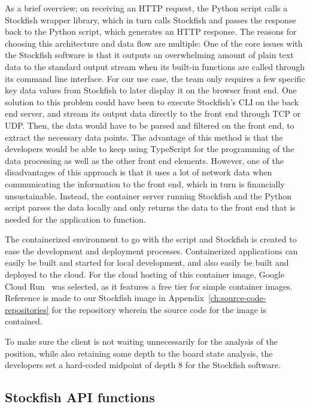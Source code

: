 As a brief overview; on receiving an HTTP request, the Python script calls a Stockfish wrapper library,
which in turn calls Stockfish and passes the response back to the Python script, which generates an HTTP response.
The reasons for choosing this architecture and data flow are multiple:
One of the core issues with the Stockfish software is that it outputs an overwhelming amount of plain text data to the
standard output stream when its built-in functions are called through its command line interface.
For our use case, the team only requires a few specific key data values from Stockfish to later display it on the
browser front end.
One solution to this problem could have been to execute Stockfish's CLI on the back end server, and stream its output
data directly to the front end through TCP or UDP\@.
Then, the data would have to be parsed and filtered on the front end, to extract the necessary data points.
The advantage of this method is that the developers would be able to keep using TypeScript for the programming of the
data processing as well as the other front end elements.
However, one of the disadvantages of this approach is that it uses a lot of network data when communicating the
information to the front end, which in turn is financially unsustainable.
Instead, the container server running Stockfish and the Python script parses the data locally and only returns the data
to the front end that is needed for the application to function.

The containerized environment to go with the script and Stockfish is created to ease the development and deployment
processes.
Containerized applications can easily be built and started for local development, and also easily be built and deployed
to the cloud.
For the cloud hosting of this container image, Google Cloud Run~\cite{google-cloud-run} was selected, as it features
a free tier for simple container images.
Reference is made to our Stockfish image in Appendix~\ref{ch:source-code-repositories} for the repository wherein the
source code for the image is contained.

To make sure the client is not waiting unnecessarily for the analysis of the position, while also retaining some depth
to the board state analysis, the developers set a hard-coded midpoint of depth 8 for the Stockfish software.

\subsection{Stockfish API functions}\label{subsec:stockfish-api-functions}

